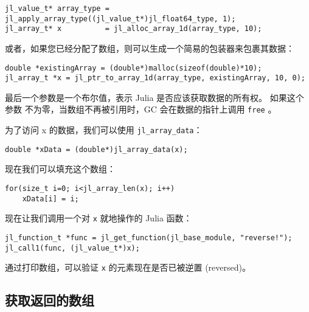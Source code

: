 \begin{lstlisting}
jl_value_t* array_type = jl_apply_array_type((jl_value_t*)jl_float64_type, 1);
jl_array_t* x          = jl_alloc_array_1d(array_type, 10);
\end{lstlisting}



或者，如果您已经分配了数组，则可以生成一个简易的包装器来包裹其数据：




\begin{lstlisting}
double *existingArray = (double*)malloc(sizeof(double)*10);
jl_array_t *x = jl_ptr_to_array_1d(array_type, existingArray, 10, 0);
\end{lstlisting}



最后一个参数是一个布尔值，表示 Julia 是否应该获取数据的所有权。 如果这个参数 不为零，当数组不再被引用时，GC 会在数据的指针上调用 \texttt{free} 。



为了访问 x 的数据，我们可以使用 \texttt{jl\_array\_data}：




\begin{lstlisting}
double *xData = (double*)jl_array_data(x);
\end{lstlisting}



现在我们可以填充这个数组：




\begin{lstlisting}
for(size_t i=0; i<jl_array_len(x); i++)
    xData[i] = i;
\end{lstlisting}



现在让我们调用一个对 \texttt{x} 就地操作的 Julia 函数：




\begin{lstlisting}
jl_function_t *func = jl_get_function(jl_base_module, "reverse!");
jl_call1(func, (jl_value_t*)x);
\end{lstlisting}



通过打印数组，可以验证 \texttt{x} 的元素现在是否已被逆置 (reversed)。



\hypertarget{10421624901695308393}{}


\subsection{获取返回的数组}



